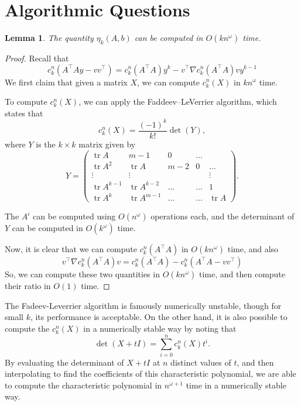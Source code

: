 \documentclass[a4paper]{article}
\newtheorem{lemma}{Lemma}
\DeclareMathOperator*{\tr}{tr}
\begin{document}
\section{Algorithmic Questions}
\begin{lemma}
    The quantity $\eta_k(A, b)$ can be computed in $O(kn^{\omega})$ time.
\end{lemma}
\begin{proof}
    Recall that 
    \[
        c_k^n(A^{\intercal}Ay - vv^{\intercal}) = c_k^n(A^{\intercal}A)y^k - v^{\intercal}\nabla c_k^n(A^{\intercal}A) v y^{k-1}
    \]
    We first claim that given a matrix $X$, we can compute $c_k^n(X)$ in $kn^{\omega}$ time.

    To compute $c_k^n(X)$, we can apply the Faddeev–LeVerrier algorithm, which states that
    \[
        c_k^n(X) = \frac{(-1)^{k}}{k!} \det(Y),
    \]
    where $Y$ is the $k\times k$ matrix given by 
    \[
        Y =
        \begin{pmatrix}
            \tr A & m-1 & 0 & \dots\\
            \tr A^2 & \tr A & m - 2 & 0 & \dots\\
            \vdots & \vdots & & & \vdots\\
            \tr A^{k-1} & \tr A^{k-2} & \dots & \dots & 1\\
            \tr A^k & \tr A^{m-1} & \dots & \dots & \tr A
        \end{pmatrix}.
    \]

    The $A^i$ can be computed using $O(n^{\omega})$ operations each, and the determinant of $Y$ can be computed in $O(k^{\omega})$ time.

    Now, it is clear that we can compute $c_k^n(A^{\intercal}A)$ in $O(kn^{\omega})$ time, and also
    \[
        v^{\intercal}\nabla c_k^n(A^{\intercal}A) v = c_k^n(A^{\intercal}A) - c_k^n(A^{\intercal}A - vv^{\intercal})
    \]
    So, we can compute these two quantities in $O(kn^{\omega})$ time, and then compute their ratio in $O(1)$ time.
\end{proof}
\begin{remark}
    The Fadeev-Leverrier algorithm is famously numerically unstable, though for small $k$, its performance is acceptable. On the other hand, it is also possible to compute the $c_k^n(X)$ in a numerically stable way by noting that 
    \[
        \det(X + t I) = \sum_{i=0}^n c_k^n(X)t^i.
    \]
    By evaluating the determinant of $X+tI$ at $n$ distinct values of $t$, and then interpolating to find the coefficients of this characteristic polynomial, we are able to compute the characteristic polynomial in $n^{\omega+1}$ time in a numerically stable way.
\end{remark}
\end{document}
